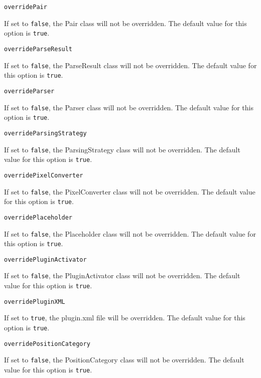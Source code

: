 \noindent\texttt{overridePair}
\begin{myindentpar}{1cm}
If set to \texttt{false}, the Pair class will not be overridden. The default value for this option is \texttt{true}.
\end{myindentpar}

\noindent\texttt{overrideParseResult}
\begin{myindentpar}{1cm}
If set to \texttt{false}, the ParseResult class will not be overridden. The default value for this option is \texttt{true}.
\end{myindentpar}

\noindent\texttt{overrideParser}
\begin{myindentpar}{1cm}
If set to \texttt{false}, the Parser class will not be overridden. The default value for this option is \texttt{true}.
\end{myindentpar}

\noindent\texttt{overrideParsingStrategy}
\begin{myindentpar}{1cm}
If set to \texttt{false}, the ParsingStrategy class will not be overridden. The default value for this option is \texttt{true}.
\end{myindentpar}

\noindent\texttt{overridePixelConverter}
\begin{myindentpar}{1cm}
If set to \texttt{false}, the PixelConverter class will not be overridden. The default value for this option is \texttt{true}.
\end{myindentpar}

\noindent\texttt{overridePlaceholder}
\begin{myindentpar}{1cm}
If set to \texttt{false}, the Placeholder class will not be overridden. The default value for this option is \texttt{true}.
\end{myindentpar}

\noindent\texttt{overridePluginActivator}
\begin{myindentpar}{1cm}
If set to \texttt{false}, the PluginActivator class will not be overridden. The default value for this option is \texttt{true}.
\end{myindentpar}

\noindent\texttt{overridePluginXML}
\begin{myindentpar}{1cm}
If set to \texttt{true}, the plugin.xml file will be overridden. The default value for this option is \texttt{true}.
\end{myindentpar}

\noindent\texttt{overridePositionCategory}
\begin{myindentpar}{1cm}
If set to \texttt{false}, the PositionCategory class will not be overridden. The default value for this option is \texttt{true}.
\end{myindentpar}


